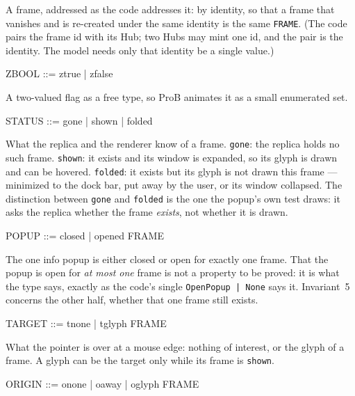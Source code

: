 \documentclass[a4paper,10pt,fleqn]{article}
\begin{document}
\begin{zed}
  [FRAME]
\end{zed}

A frame, addressed as the code addresses it: by identity, so that a frame that
vanishes and is re-created under the same identity is the same \texttt{FRAME}.
(The code pairs the frame id with its Hub; two Hubs may mint one id, and the
pair is the identity.  The model needs only that identity be a single value.)

\begin{zed}
  ZBOOL ::= ztrue | zfalse
\end{zed}

A two-valued flag as a free type, so ProB animates it as a small enumerated
set.

\begin{zed}
  STATUS ::= gone | shown | folded
\end{zed}

What the replica and the renderer know of a frame.  \texttt{gone}: the replica
holds no such frame.  \texttt{shown}: it exists and its window is expanded, so
its glyph is drawn and can be hovered.  \texttt{folded}: it exists but its
glyph is not drawn this frame --- minimized to the dock bar, put away by the
user, or its window collapsed.  The distinction between \texttt{gone} and
\texttt{folded} is the one the popup's own test draws: it asks the replica
whether the frame \emph{exists}, not whether it is drawn.

\begin{zed}
  POPUP ::= closed | opened \ldata FRAME \rdata
\end{zed}

The one info popup is either closed or open for exactly one frame.  That the
popup is open for \emph{at most one} frame is not a property to be proved: it is
what the type says, exactly as the code's single \texttt{OpenPopup | None}
says it.  Invariant~5 concerns the other half, whether that one frame still
exists.

\begin{zed}
  TARGET ::= tnone | tglyph \ldata FRAME \rdata
\end{zed}

What the pointer is over at a mouse edge: nothing of interest, or the glyph of
a frame.  A glyph can be the target only while its frame is \texttt{shown}.

\begin{zed}
  ORIGIN ::= onone | oaway | oglyph \ldata FRAME \rdata
\end{zed}
\end{document}
